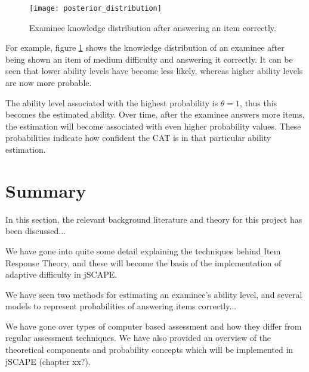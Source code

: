 \begin{figure}[H]
\centering
\texttt{[image: posterior\_distribution]}
\caption{Examinee knowledge distribution after answering an item correctly.}
\label{fig:posterior_distribution}
\end{figure}

For example, figure \ref{fig:posterior_distribution} shows the knowledge distribution of an examinee after being shown an item of medium difficulty and answering it correctly. It can be seen that lower ability levels have become less likely, whereas higher ability levels are now more probable.\newline

The ability level associated with the highest probability is $\theta=1$, thus this becomes the estimated ability. Over time, after the examinee answers more items, the estimation will become associated with even higher probability values. These probabilities indicate how confident the CAT is in that particular ability estimation.

\section{Summary}
In this section, the relevant background literature and theory for this project has been discussed...\newline

We have gone into quite some detail explaining the techniques behind Item Response Theory, and these will become the basis of the implementation of adaptive difficulty in jSCAPE.\newline

We have seen two methods for estimating an examinee's ability level, and several models to represent probabilities of answering items correctly...\newline

We have gone over types of computer based assessment and how they differ from regular assessment techniques. We have also provided an overview of the theoretical components and probability concepts which will be implemented in jSCAPE (chapter xx?).
